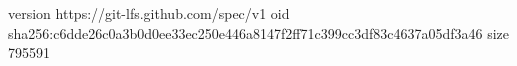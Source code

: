 version https://git-lfs.github.com/spec/v1
oid sha256:c6dde26c0a3b0d0ee33ec250e446a8147f2ff71c399cc3df83c4637a05df3a46
size 795591
